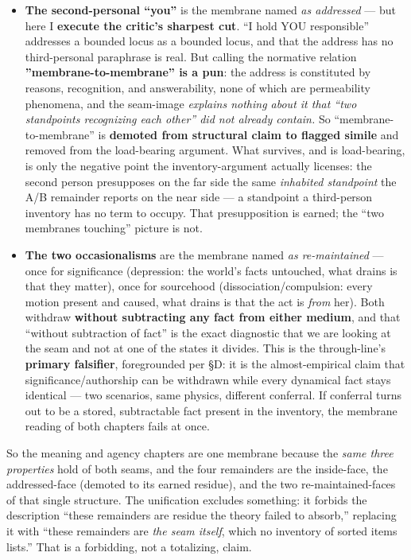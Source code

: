 \documentclass[11pt]{article}
\begin{document}
\begin{itemize}
\item \textbf{The second-personal ``you''} is the membrane named \emph{as addressed} — but here I \textbf{execute the critic's sharpest cut}. ``I hold YOU responsible'' addresses a bounded locus as a bounded locus, and that the address has no third-personal paraphrase is real. But calling the normative relation \textbf{''membrane-to-membrane'' is a pun}: the address is constituted by reasons, recognition, and answerability, none of which are permeability phenomena, and the seam-image \emph{explains nothing about it that ``two standpoints recognizing each other'' did not already contain.} So ``membrane-to-membrane'' is \textbf{demoted from structural claim to flagged simile} and removed from the load-bearing argument. What survives, and is load-bearing, is only the negative point the inventory-argument actually licenses: the second person presupposes on the far side the same \emph{inhabited standpoint} the A/\allowbreak{}B remainder reports on the near side — a standpoint a third-person inventory has no term to occupy. That presupposition is earned; the ``two membranes touching'' picture is not.
\end{itemize}

\begin{itemize}
\item \textbf{The two occasionalisms} are the membrane named \emph{as re-maintained} — once for significance (depression: the world's facts untouched, what drains is that they matter), once for sourcehood (dissociation/\allowbreak{}compulsion: every motion present and caused, what drains is that the act is \emph{from} her). Both withdraw \textbf{without subtracting any fact from either medium}, and that ``without subtraction of fact'' is the exact diagnostic that we are looking at the seam and not at one of the states it divides. This is the through-line's \textbf{primary falsifier}, foregrounded per §D: it is the almost-empirical claim that significance/\allowbreak{}authorship can be withdrawn while every dynamical fact stays identical — two scenarios, same physics, different conferral. If conferral turns out to be a stored, subtractable fact present in the inventory, the membrane reading of both chapters fails at once.
\end{itemize}

So the meaning and agency chapters are one membrane because the \emph{same three properties} hold of both seams, and the four remainders are the inside-face, the addressed-face (demoted to its earned residue), and the two re-maintained-faces of that single structure. The unification excludes something: it forbids the description ``these remainders are residue the theory failed to absorb,'' replacing it with ``these remainders are \emph{the seam itself}, which no inventory of sorted items lists.'' That is a forbidding, not a totalizing, claim.
\end{document}

